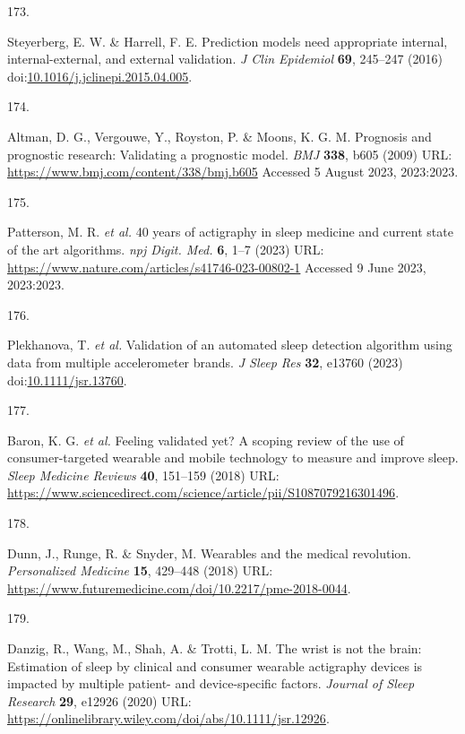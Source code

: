 \documentclass[
  10pt,
]{scrbook}
\newlength{\cslhangindent}
\newlength{\csllabelwidth}
\newlength{\cslentryspacingunit} %
\newenvironment{CSLReferences}[2] %
 {%
  \setlength{\parindent}{0pt}
  \ifodd #1
  \let\oldpar\par
  \def\par{\hangindent=\cslhangindent\oldpar}
  \fi
  \setlength{\parskip}{#2\cslentryspacingunit}
 }%
 {}
\newcommand{\CSLLeftMargin}[1]{\parbox[t]{\csllabelwidth}{#1}}
\newcommand{\CSLRightInline}[1]{\parbox[t]{\linewidth - \csllabelwidth}{#1}\break}
\let\originaltextbf\textbf
\renewcommand{\textbf}[1]{\textcolor{color1}{\originaltextbf{#1}}}
\begin{document}
\begin{CSLReferences}{0}{0}
\leavevmode{}%
\CSLLeftMargin{173. }%
\CSLRightInline{Steyerberg, E. W. \& Harrell, F. E. Prediction models
need appropriate internal, internal-external, and external validation.
\emph{J Clin Epidemiol} \textbf{69}, 245--247 (2016)
doi:\href{https://doi.org/10.1016/j.jclinepi.2015.04.005}{10.1016/j.jclinepi.2015.04.005}.}

\leavevmode{}%
\CSLLeftMargin{174. }%
\CSLRightInline{Altman, D. G., Vergouwe, Y., Royston, P. \& Moons, K. G.
M. Prognosis and prognostic research: Validating a prognostic model.
\emph{{BMJ}} \textbf{338}, b605 (2009) URL:
\url{https://www.bmj.com/content/338/bmj.b605} Accessed 5 August 2023,
2023:2023.}

\leavevmode{}%
\CSLLeftMargin{175. }%
\CSLRightInline{Patterson, M. R. \emph{et al.} 40 years of actigraphy in
sleep medicine and current state of the art algorithms. \emph{npj Digit.
Med.} \textbf{6}, 1--7 (2023) URL:
\url{https://www.nature.com/articles/s41746-023-00802-1} Accessed 9 June
2023, 2023:2023.}

\leavevmode{}%
\CSLLeftMargin{176. }%
\CSLRightInline{Plekhanova, T. \emph{et al.} Validation of an automated
sleep detection algorithm using data from multiple accelerometer brands.
\emph{J Sleep Res} \textbf{32}, e13760 (2023)
doi:\href{https://doi.org/10.1111/jsr.13760}{10.1111/jsr.13760}.}

\leavevmode{}%
\CSLLeftMargin{177. }%
\CSLRightInline{Baron, K. G. \emph{et al.} Feeling validated yet? A
scoping review of the use of consumer-targeted wearable and mobile
technology to measure and improve sleep. \emph{Sleep Medicine Reviews}
\textbf{40}, 151--159 (2018) URL:
\url{https://www.sciencedirect.com/science/article/pii/S1087079216301496}.}

\leavevmode{}%
\CSLLeftMargin{178. }%
\CSLRightInline{Dunn, J., Runge, R. \& Snyder, M. Wearables and the
medical revolution. \emph{Personalized Medicine} \textbf{15}, 429--448
(2018) URL:
\url{https://www.futuremedicine.com/doi/10.2217/pme-2018-0044}.}

\leavevmode{}%
\CSLLeftMargin{179. }%
\CSLRightInline{Danzig, R., Wang, M., Shah, A. \& Trotti, L. M. The
wrist is not the brain: Estimation of sleep by clinical and consumer
wearable actigraphy devices is impacted by multiple patient- and
device-specific factors. \emph{Journal of Sleep Research} \textbf{29},
e12926 (2020) URL:
\url{https://onlinelibrary.wiley.com/doi/abs/10.1111/jsr.12926}.}


\end{CSLReferences}
\end{document}
